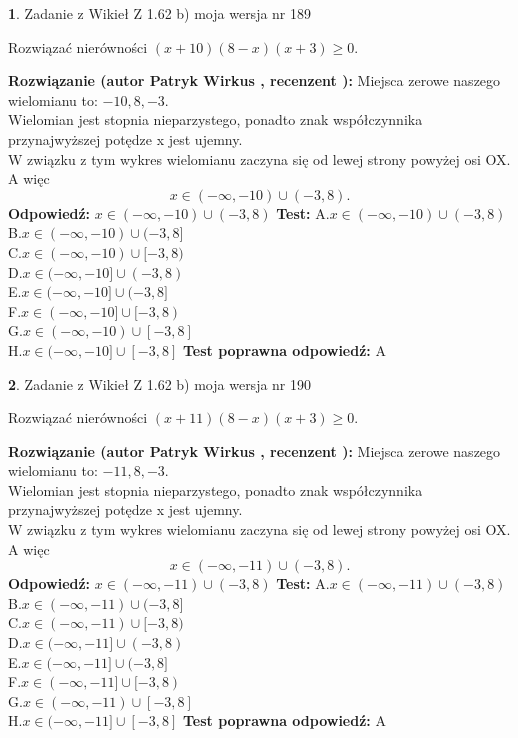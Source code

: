 \documentclass[12pt, a4paper]{article}
\theoremstyle{definition} %
\newtheorem{zad}{}
\newcommand{\zadStart}[1]{\begin{zad}#1\newline}
\newcommand{\zadStop}{\end{zad}}
\newcommand{\rozwStart}[2]{\noindent \textbf{Rozwiązanie (autor #1 , recenzent #2): }\newline}
\newcommand{\rozwStop}{\newline}
\newcommand{\odpStart}{\noindent \textbf{Odpowiedź:}\newline}
\newcommand{\odpStop}{\newline}
\newcommand{\testStart}{\noindent \textbf{Test:}\newline}
\newcommand{\testStop}{\newline}
\newcommand{\kluczStart}{\noindent \textbf{Test poprawna odpowiedź:}\newline}
\newcommand{\kluczStop}{\newline}
\begin{document}
\zadStart{Zadanie z Wikieł Z 1.62 b) moja wersja nr 189}

Rozwiązać nierówności $(x+10)(8-x)(x+3)\ge0$.
\zadStop
\rozwStart{Patryk Wirkus}{}
Miejsca zerowe naszego wielomianu to: $-10, 8, -3$.\\
Wielomian jest stopnia nieparzystego, ponadto znak współczynnika przy\linebreak najwyższej potędze x jest ujemny.\\ W związku z tym wykres wielomianu zaczyna się od lewej strony powyżej osi OX. A więc $$x \in (-\infty,-10) \cup (-3,8).$$
\rozwStop
\odpStart
$x \in (-\infty,-10) \cup (-3,8)$
\odpStop
\testStart
A.$x \in (-\infty,-10) \cup (-3,8)$\\
B.$x \in (-\infty,-10) \cup (-3,8]$\\
C.$x \in (-\infty,-10) \cup [-3,8)$\\
D.$x \in (-\infty,-10] \cup (-3,8)$\\
E.$x \in (-\infty,-10] \cup (-3,8]$\\
F.$x \in (-\infty,-10] \cup [-3,8)$\\
G.$x \in (-\infty,-10) \cup [-3,8]$\\
H.$x \in (-\infty,-10] \cup [-3,8]$
\testStop
\kluczStart
A
\kluczStop



\zadStart{Zadanie z Wikieł Z 1.62 b) moja wersja nr 190}

Rozwiązać nierówności $(x+11)(8-x)(x+3)\ge0$.
\zadStop
\rozwStart{Patryk Wirkus}{}
Miejsca zerowe naszego wielomianu to: $-11, 8, -3$.\\
Wielomian jest stopnia nieparzystego, ponadto znak współczynnika przy\linebreak najwyższej potędze x jest ujemny.\\ W związku z tym wykres wielomianu zaczyna się od lewej strony powyżej osi OX. A więc $$x \in (-\infty,-11) \cup (-3,8).$$
\rozwStop
\odpStart
$x \in (-\infty,-11) \cup (-3,8)$
\odpStop
\testStart
A.$x \in (-\infty,-11) \cup (-3,8)$\\
B.$x \in (-\infty,-11) \cup (-3,8]$\\
C.$x \in (-\infty,-11) \cup [-3,8)$\\
D.$x \in (-\infty,-11] \cup (-3,8)$\\
E.$x \in (-\infty,-11] \cup (-3,8]$\\
F.$x \in (-\infty,-11] \cup [-3,8)$\\
G.$x \in (-\infty,-11) \cup [-3,8]$\\
H.$x \in (-\infty,-11] \cup [-3,8]$
\testStop
\kluczStart
A
\kluczStop
\end{document}
